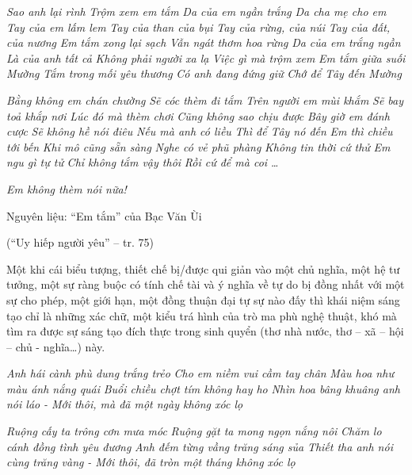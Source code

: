 \documentclass[../main.tex]{subfiles}
\begin{document}
\begin{multicols}{2}
\begin{blockquote}
\textit{Sao anh lại rình }
\textit{Trộm xem em tắm} 
\textit{Da của em ngần trắng} 
\textit{Da cha mẹ cho em} 
\textit{Tay của em lấm lem} 
\textit{Tay của than của bụi} 
\textit{Tay của rừng, của núi} 
\textit{Tay của đất, của nương} 
\textit{Em tắm xong lại sạch} 
\textit{Vẫn ngát thơm hoa rừng} 
\textit{Da của em trắng ngần} 
\textit{Là của anh tất cả} 
\textit{Không phải người xa lạ} 
\textit{Việc gì mà trộm xem} 
\textit{Em tắm giữa suối Mường} 
\textit{Tắm trong mối yêu thương} 
\textit{Có anh đang đứng giữ} 
\textit{Chớ để Tây đến Mường} 

\textit{Bằng không em chán chường} 
\textit{Sẽ cóc thèm đi tắm} 
\textit{Trên người em mùi khắm} 
\textit{Sẽ bay toả khắp nơi} 
\textit{Lúc đó mà thèm chơi} 
\textit{Cũng không sao chịu được} 
\textit{Bây giờ em đánh cược} 
\textit{Sẽ không hề nói điêu} 
\textit{Nếu mà anh có liều} 
\textit{Thì để Tây nó đến} 
\textit{Em thì chiều tới bến} 
\textit{Khi mô cũng sẵn sàng} 
\textit{Nghe có vẻ phũ phàng} 
\textit{Không tin thời cứ thử} 
\textit{Em ngu gì tự tử} 
\textit{Chỉ không tắm vậy thôi} 
\textit{Rồi cứ để mà coi} 
\textit{…} 

\textit{Em không thèm nói nữa!} 

Nguyên liệu: “Em tắm” của Bạc Văn Ùi 

(“Uy hiếp người yêu” – tr. 75) 

\end{blockquote}


Một khi cái biểu tượng, thiết chế bị/được qui giản vào một chủ nghĩa, một hệ tư tưởng, một sự ràng buộc có tính chế tài và ý nghĩa về tự do bị đồng nhất với một sự cho phép, một giới hạn, một đồng thuận đại tự sự nào đấy thì khái niệm sáng tạo chỉ là những xác chữ, một kiểu trá hình của trò ma phù nghệ thuật, khó mà tìm ra được sự sáng tạo đích thực trong sinh quyển (thơ nhà nước, thơ – xã – hội – chủ - nghĩa…) này. 
\begin{blockquote}


\textit{Anh hái cành phù dung trắng trẻo} 
\textit{Cho em niềm vui cầm tay chân} 
\textit{Màu hoa như màu ánh nắng quái} 
\textit{Buổi chiều chợt tím không hay ho} 
\textit{Nhìn hoa bâng khuâng anh nói láo} 
\textit{- Mới thôi, mà đã một ngày không xóc lọ} 

\textit{Ruộng cấy ta trông cơn mưa móc} 
\textit{Ruộng gặt ta mong ngọn nắng nôi} 
\textit{Chăm lo cánh đồng tình yêu đương} 
\textit{Anh đếm từng vầng trăng sáng sủa} 
\textit{Thiết tha anh nói cùng trăng vàng} 
\textit{- Mới thôi, đã tròn một tháng không xóc lọ} 


\end{blockquote}
\end{multicols}
\end{document}
